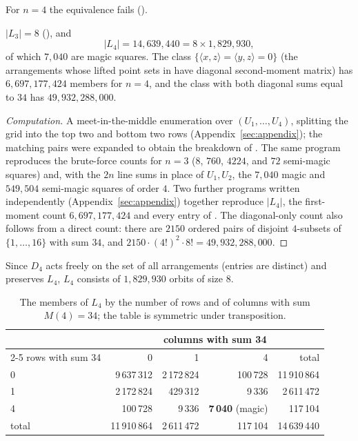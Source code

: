 For $n=4$ the equivalence fails ().

\begin{proposition}
\label{prop:L4}
$|L_3|=8$ (), and
\[
|L_4|=14{,}639{,}440=8\times1{,}829{,}930,
\]
of which $7{,}040$ are magic squares.
The class $\{\langle x,z\rangle=\langle y,z\rangle=0\}$ (the arrangements whose lifted point sets in \cite{mathewson_gems} have diagonal second-moment matrix) has $6{,}697{,}177{,}424$ members for $n=4$, and the class with both diagonal sums equal to $34$ has $49{,}932{,}288{,}000$.
\end{proposition}

\begin{proof}[Computation]
A meet-in-the-middle enumeration over $(U_1,\dots,U_4)$, splitting the grid into the top two and bottom two rows (Appendix~\ref{sec:appendix}); the matching pairs were expanded to obtain the breakdown of .
The same program reproduces the brute-force counts for $n=3$ ($8$, $760$, $4224$, and $72$ semi-magic squares) and, with the $2n$ line sums in place of $U_1,U_2$, the $7{,}040$ magic and $549{,}504$ semi-magic squares of order $4$.
Two further programs written independently (Appendix~\ref{sec:appendix}) together reproduce $|L_4|$, the first-moment count $6{,}697{,}177{,}424$ and every entry of .
The diagonal-only count also follows from a direct count: there are $2150$ ordered pairs of disjoint $4$-subsets of $\{1,\dots,16\}$ with sum $34$, and $2150\cdot(4!)^2\cdot8!=49{,}932{,}288{,}000$.
\end{proof}

Since $D_4$ acts freely on the set of all arrangements (entries are distinct) and preserves $L_4$, $L_4$ consists of $1{,}829{,}930$ orbits of size $8$.

\begin{table}[htbp]
\centering
\small
\begin{tabular}{lrrrr}
\toprule
 & \multicolumn{4}{c}{columns with sum 34} \\
\cmidrule(lr){2-5}
rows with sum 34 & 0 & 1 & 4 & total \\
\midrule
0 & 9\,637\,312 & 2\,172\,824 & 100\,728 & 11\,910\,864 \\
1 & 2\,172\,824 & 429\,312 & 9\,336 & 2\,611\,472 \\
4 & 100\,728 & 9\,336 & \textbf{7\,040} (magic) & 117\,104 \\
\midrule
total & 11\,910\,864 & 2\,611\,472 & 117\,104 & 14\,639\,440 \\
\bottomrule
\end{tabular}
\caption{The members of $L_4$ by the number of rows and of columns with sum $M(4)=34$; the table is symmetric under transposition.}
\label{tab:L4}
\end{table}

